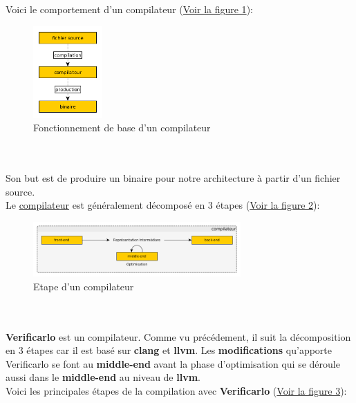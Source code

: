 \documentclass[11pt]{article}
\begin{document}
Voici le comportement d'un compilateur
(\hyperref[fig:orge695f88]{Voir la figure 1}):
\\ \vspace{5mm}
\begin{figure}[htbp]
\centering
\includegraphics[width=100px]{../ressources/compilation.png}
\caption{\label{fig:orge695f88}Fonctionnement de base d'un compilateur}
\end{figure}\\
\\ \vspace{5mm}
Son but est de produire un binaire pour notre architecture à partir
d'un fichier source.
\\ \vspace{5mm}
Le \href{https://sifflez.org/lectures/compil/week1/3-compiler-anatomy.pdf}{compilateur} est généralement décomposé en 3 étapes
(\hyperref[fig:org97c1cff]{Voir la figure 2}):
\\ \vspace{5mm}
\begin{figure}[htbp]
\centering
\includegraphics[width=300px]{../ressources/compiler_step.png}
\caption{\label{fig:org97c1cff}Etape d'un compilateur}
\end{figure}\\
\\ \vspace{5mm}
\textbf{Verificarlo} est un compilateur. Comme vu précédement, il suit la
décomposition en 3 étapes car il est basé sur \textbf{clang} et
\textbf{llvm}. Les \textbf{modifications} qu'apporte Verificarlo se font au
\textbf{middle-end} avant la phase d'optimisation qui se déroule aussi
dans le \textbf{middle-end} au niveau de \textbf{llvm}.
\\ \vspace{5mm}
Voici les principales étapes de la compilation avec \textbf{Verificarlo}
(\hyperref[fig:orgfd31292]{Voir la figure 3}):
\end{document}
